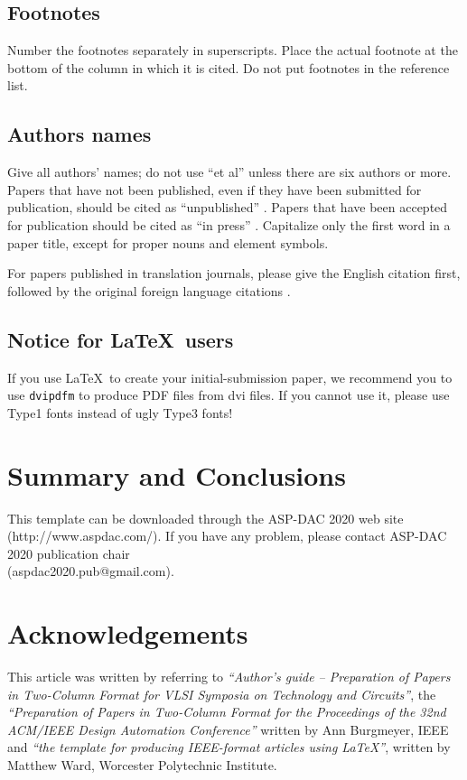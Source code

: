 \subsection{Footnotes}
Number the footnotes separately in superscripts. Place the actual
footnote at the bottom of the column in which it is cited. Do not put
footnotes in the reference list.

\subsection{Authors names}

Give all authors' names; do not use ``et al'' unless there are six
authors or more. Papers that have not been published, even if they have
been submitted for publication, should be cited as
``unpublished'' \cite{unpub}.  Papers that have been accepted for
publication should be cited as ``in press'' \cite{inpress}.
Capitalize only the first word in a paper title, except for proper nouns
and element symbols.

For papers published in translation journals, please give the English
citation first, followed by the original foreign language
citations \cite{trans}.

\subsection{Notice for \LaTeX\ users}

If you use \LaTeX\ to create your initial-submission paper, we recommend you
to use {\tt dvipdfm} to produce PDF files from dvi files. If you cannot
use it, please use Type1 fonts instead of ugly Type3 fonts!

\section{Summary and Conclusions}

This template can be downloaded through the ASP-DAC 2020 web site
(http://www.aspdac.com/). If you have any problem, please contact ASP-DAC
2020 publication chair\\
(aspdac2020.pub@gmail.com).

\section*{\sc Acknowledgements}
This article was written by referring to {\em ``Author's guide --
Preparation of Papers in Two-Column Format for VLSI Symposia on
Technology and Circuits''}, the {\em ``Preparation of Papers in
Two-Column Format for the Proceedings of the 32nd ACM/IEEE Design
Automation Conference''} written by Ann Burgmeyer, IEEE and {\em ``the
template for producing IEEE-format articles using \LaTeX''}, written by
Matthew Ward, Worcester Polytechnic Institute.

